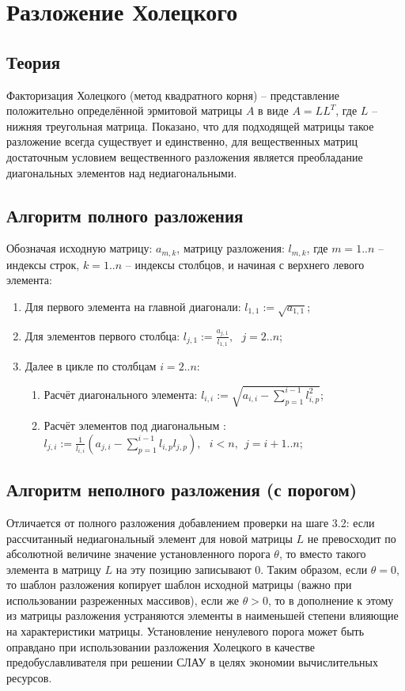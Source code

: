 \section{Разложение Холецкого}

\subsection{Теория}

Факторизация Холецкого (метод квадратного корня) -- представление положительно определённой эрмитовой матрицы $A$ в виде $A = LL^T$, где $L$ -- нижняя треугольная матрица. Показано, что для подходящей матрицы такое разложение всегда существует и единственно, для вещественных матриц достаточным условием вещественного разложения является преобладание диагональных элементов над недиагональными.

\subsection{Алгоритм полного разложения}

Обозначая исходную матрицу: $a_{m,k}$, матрицу разложения: $l_{m,k}$, где $m = 1..n$ -- индексы строк, $k=1..n$ -- индексы столбцов, и начиная с верхнего левого элемента:
\begin{enumerate}
    \item Для первого элемента на главной диагонали: $l_{1,1} := \sqrt{a_{1,1}}$;

    \item Для элементов первого столбца: $l_{j,1} := \frac{a_{j,1}}{l_{1,1}}, ~~~ j=2..n$;

    \item Далее в цикле по столбцам $i=2..n$:
    \begin{enumerate}
        \item Расчёт диагонального элемента: $l_{i,i} := \sqrt{a_{i,i} - \sum_{p=1}^{i-1}l_{i,p}^2}$;

        \item Расчёт элементов под диагональным : $l_{j,i} := \frac{1}{l_{i,i}}(a_{j,i} - \sum_{p=1}^{i-1}l_{i,p}l_{j,p}), ~~~ i<n,~~j=i+1..n$;
    \end{enumerate}
\end{enumerate}

\subsection{Алгоритм неполного разложения (с порогом)}
Отличается от полного разложения добавлением проверки на шаге 3.2: если рассчитанный недиагональный элемент для новой матрицы $L$ не превосходит по абсолютной величине значение установленного порога $\theta$, то вместо такого элемента в матрицу $L$ на эту позицию записывают 0. Таким образом, если $\theta = 0$, то шаблон разложения копирует шаблон исходной матрицы (важно при использовании разреженных массивов), если же $\theta>0$, то в дополнение к этому из матрицы разложения устраняются элементы в наименьшей степени влияющие на характеристики матрицы. Установление ненулевого порога может быть оправдано при использовании разложения Холецкого в качестве предобуславливателя при решении СЛАУ в целях экономии вычислительных ресурсов.


